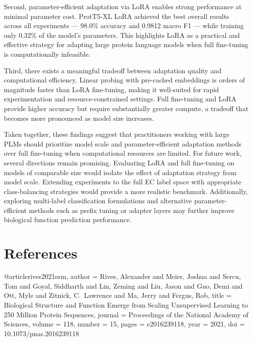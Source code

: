 \documentclass{article}
\begin{document}
Second, parameter-efficient adaptation via LoRA enables strong performance at minimal parameter cost. ProtT5-XL LoRA achieved the best overall results across all experiments — 98.0\% accuracy and 0.9812 macro F1 — while training only 0.32\% of the model's parameters. This highlights LoRA as a practical and effective strategy for adapting large protein language models when full fine-tuning is computationally infeasible.

Third, there exists a meaningful tradeoff between adaptation quality and computational efficiency. Linear probing with pre-cached embeddings is orders of magnitude faster than LoRA fine-tuning, making it well-suited for rapid experimentation and resource-constrained settings. Full fine-tuning and LoRA provide higher accuracy but require substantially greater compute, a tradeoff that becomes more pronounced as model size increases.

Taken together, these findings suggest that practitioners working with large PLMs should prioritize model scale and parameter-efficient adaptation methods over full fine-tuning when computational resources are limited. For future work, several directions remain promising. Evaluating LoRA and full fine-tuning on models of comparable size would isolate the effect of adaptation strategy from model scale. Extending experiments to the full EC label space with appropriate class-balancing strategies would provide a more realistic benchmark. Additionally, exploring multi-label classification formulations and alternative parameter-efficient methods such as prefix tuning or adapter layers may further improve biological function prediction performance.


\section*{References}



@article{rives2021esm,
  author    = {Rives, Alexander and Meier, Joshua and Sercu, Tom and
               Goyal, Siddharth and Lin, Zeming and Liu, Jason and
               Guo, Demi and Ott, Myle and Zitnick, C.~Lawrence and
               Ma, Jerry and Fergus, Rob},
  title     = {Biological Structure and Function Emerge from Scaling
               Unsupervised Learning to 250 Million Protein Sequences},
  journal   = {Proceedings of the National Academy of Sciences},
  volume    = {118},
  number    = {15},
  pages     = {e2016239118},
  year      = {2021},
  doi       = {10.1073/pnas.2016239118}
}
\end{document}
